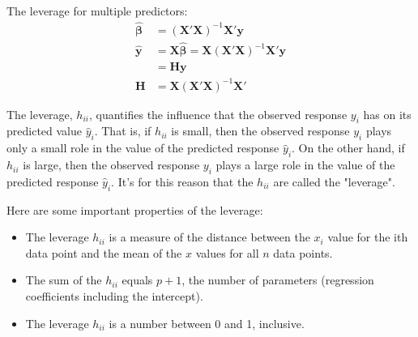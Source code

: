 \documentclass[12pt,a4paper]{article}%
\theoremstyle{definition}
\theoremstyle{plain}
\numberwithin{equation}{section}
\begin{document}
The leverage for multiple predictors:
\begin{align*}
\boldsymbol{\hat{\beta}} &= (\mathbf{X'}\mathbf{X})^{-1}\mathbf{X'}\mathbf{y} \\
\mathbf{\hat{y}}  &= \mathbf{X}\boldsymbol{\hat{\beta}}= \mathbf{X}(\mathbf{X'}\mathbf{X})^{-1}\mathbf{X'}\mathbf{y} \\
		&= \mathbf{H}\mathbf{y} \\
\mathbf{H} &= \mathbf{X}(\mathbf{X'}\mathbf{X})^{-1}\mathbf{X'} 
\end{align*}

The leverage, $h_{ii}$, quantifies the influence that the observed response $y_{i}$ has on its predicted value $\hat{y}_{i}$. 
That is, if $h_{ii}$ is small, then the observed response $y_{i}$ plays only a small role in the value of the predicted response $\hat{y}_{i}$. 
On the other hand, if $h_{ii}$ is large, then the observed response $y_{i}$ plays a large role in the value of the predicted response $\hat{y}_{i}$. 
It's for this reason that the $h_{ii}$ are called the "leverage".

Here are some important properties of the leverage:
\begin{itemize}
\item The leverage $h_{ii}$ is a measure of the distance between the $x_{i}$ value for the ith data point and the mean of the $x$ values for all $n$ data points.
\item The sum of the $h_{ii}$ equals $p+1$, the number of parameters (regression coefficients including the intercept).
\item The leverage $h_{ii}$ is a number between 0 and 1, inclusive.
\end{itemize}
\end{document}

